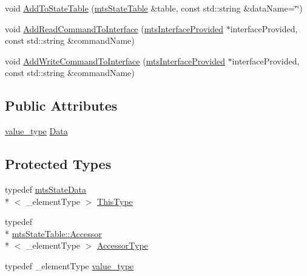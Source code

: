 \begin{DoxyCompactItemize}
void \hyperlink{classmts_state_data_a0c842d51fed06b16cce7da28a0b3ee5b}{Add\-To\-State\-Table} (\hyperlink{classmts_state_table}{mts\-State\-Table} \&table, const std\-::string \&data\-Name=\char`\"{}\char`\"{})
\item 
void \hyperlink{classmts_state_data_ad75f6fd4812170a7c4f8352f73cf2c5d}{Add\-Read\-Command\-To\-Interface} (\hyperlink{classmts_interface_provided}{mts\-Interface\-Provided} $\ast$interface\-Provided, const std\-::string \&command\-Name)
\item 
void \hyperlink{classmts_state_data_a0a840896d80f8ad090700855e18aae9e}{Add\-Write\-Command\-To\-Interface} (\hyperlink{classmts_interface_provided}{mts\-Interface\-Provided} $\ast$interface\-Provided, const std\-::string \&command\-Name)
\end{DoxyCompactItemize}
\subsection*{Public Attributes}
\begin{DoxyCompactItemize}
\item 
\hyperlink{classmts_state_data_aeffdf781c6be5cac19466d4f3d25b3a3}{value\-\_\-type} \hyperlink{classmts_state_data_a3f34dd7340ba9ff2f006a00ca7557f15}{Data}
\end{DoxyCompactItemize}
\subsection*{Protected Types}
\begin{DoxyCompactItemize}
\item 
typedef \hyperlink{classmts_state_data}{mts\-State\-Data}\\*
$<$ \-\_\-element\-Type $>$ \hyperlink{classmts_state_data_aaa07d52871cdcbe7388b69bbcf1b114a}{This\-Type}
\item 
typedef \\*
\hyperlink{classmts_state_table_1_1_accessor}{mts\-State\-Table\-::\-Accessor}\\*
$<$ \-\_\-element\-Type $>$ \hyperlink{classmts_state_data_a21eb9a3d0093820221159ffd63fa9616}{Accessor\-Type}
\item 
typedef \-\_\-element\-Type \hyperlink{classmts_state_data_aeffdf781c6be5cac19466d4f3d25b3a3}{value\-\_\-type}
\end{DoxyCompactItemize}
